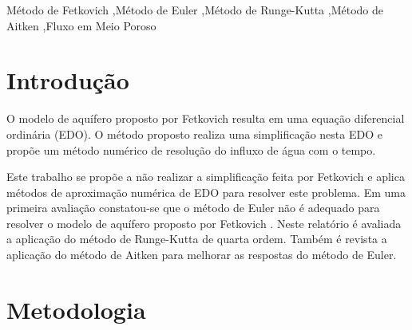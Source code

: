 \documentclass[final,5p]{elsarticle}
\numberwithin{equation}{section}
\begin{document}
\begin{frontmatter}
\begin{abstract}
\end{abstract}




\begin{keyword}
    Método de Fetkovich \sep Método de Euler \sep Método de Runge-Kutta \sep Método de Aitken \sep Fluxo em Meio Poroso



\end{keyword}

\end{frontmatter}


\section{Introdução}

    O modelo de aquífero proposto por Fetkovich resulta em uma equação diferencial ordinária (EDO). O método proposto realiza uma simplificação nesta EDO e propõe um método numérico de resolução do influxo de água com o tempo.

    Este trabalho se propõe a não realizar a simplificação feita por Fetkovich e aplica métodos de aproximação numérica de EDO para resolver este problema. Em uma primeira avaliação constatou-se que o método de Euler não é adequado para resolver o modelo de aquífero proposto por Fetkovich \cite{relatorioeuler}. Neste relatório é avaliada a aplicação do método de Runge-Kutta de quarta ordem. Também é revista a aplicação do método de Aitken para melhorar as respostas do método de Euler.

\section{Metodologia}
\end{document}
